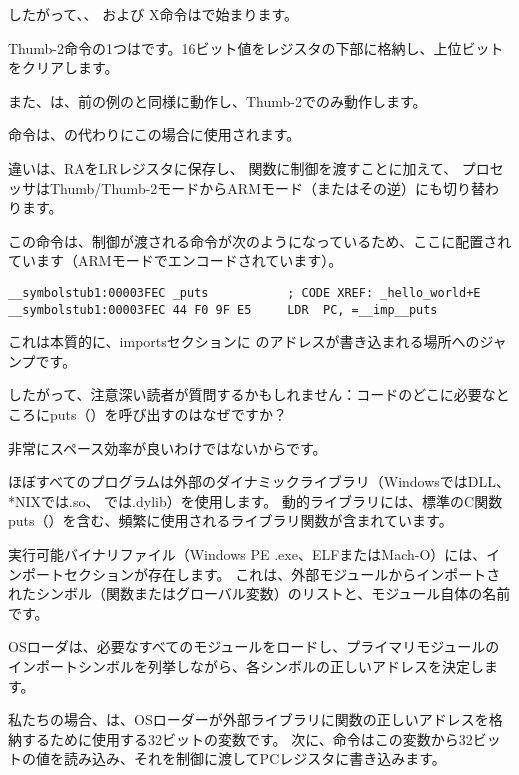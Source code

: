 
したがって、、  および X命令はで始まります。

Thumb-2命令の1つはです。16ビット値をレジスタの下部に格納し、上位ビットをクリアします。

また、は、前の例のと同様に動作し、Thumb-2でのみ動作します。


命令は、の代わりにこの場合に使用されます。

違いは、\ac{RA}を\ac{LR}レジスタに保存し、 \puts 関数に制御を渡すことに加えて、
プロセッサはThumb/Thumb-2モードからARMモード（またはその逆）にも切り替わります。

この命令は、制御が渡される命令が次のようになっているため、ここに配置されています（ARMモードでエンコードされています）。

\begin{lstlisting}[style=customasmARM]
__symbolstub1:00003FEC _puts           ; CODE XREF: _hello_world+E
__symbolstub1:00003FEC 44 F0 9F E5     LDR  PC, =__imp__puts
\end{lstlisting}

これは本質的に、importsセクションに \puts のアドレスが書き込まれる場所へのジャンプです。

したがって、注意深い読者が質問するかもしれません：コードのどこに必要なところにputs（）を呼び出すのはなぜですか？

非常にスペース効率が良いわけではないからです。

ほぼすべてのプログラムは外部のダイナミックライブラリ（WindowsではDLL、*NIXでは.so、 \MacOSX では.dylib）を使用します。
動的ライブラリには、標準のC関数puts（）を含む、頻繁に使用されるライブラリ関数が含まれています。

実行可能バイナリファイル（Windows PE .exe、ELFまたはMach-O）には、インポートセクションが存在します。
これは、外部モジュールからインポートされたシンボル（関数またはグローバル変数）のリストと、モジュール自体の名前です。

\ac{OS}ローダは、必要なすべてのモジュールをロードし、プライマリモジュールのインポートシンボルを列挙しながら、各シンボルの正しいアドレスを決定します。

私たちの場合、は、\ac{OS}ローダーが外部ライブラリに関数の正しいアドレスを格納するために使用する32ビットの変数です。
次に、命令はこの変数から32ビットの値を読み込み、それを制御に渡して\ac{PC}レジスタに書き込みます。

